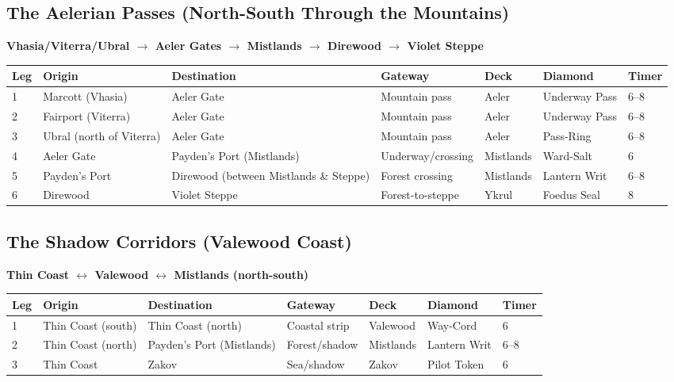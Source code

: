 \documentclass[11pt,letterpaper,twoside]{book}
\begin{document}
\subsection{The Aelerian Passes (North-South Through the Mountains)}

\textbf{Vhasia/Viterra/Ubral $\rightarrow$ Aeler Gates $\rightarrow$ Mistlands $\rightarrow$ Direwood $\rightarrow$ Violet Steppe}

\begin{longtable}{|p{1.5cm}|p{2.5cm}|p{2.5cm}|p{1.5cm}|p{2cm}|p{1.5cm}|}
\hline
\textbf{Leg} & \textbf{Origin} & \textbf{Destination} & \textbf{Gateway} & \textbf{Deck} & \textbf{Diamond} & \textbf{Timer} \\
 & Marcott (Vhasia) & Aeler Gate & Mountain pass & Aeler & Underway Pass & 6--8 \\
2 & Fairport (Viterra) & Aeler Gate & Mountain pass & Aeler & Underway Pass & 6--8 \\
3 & Ubral (north of Viterra) & Aeler Gate & Mountain pass & Aeler & Pass-Ring & 6--8 \\
4 & Aeler Gate & Payden's Port (Mistlands) & Underway/crossing & Mistlands & Ward-Salt & 6 \\
5 & Payden's Port & Direwood (between Mistlands \& Steppe) & Forest crossing & Mistlands & Lantern Writ & 6--8 \\
6 & Direwood & Violet Steppe & Forest-to-steppe & Ykrul & Foedus Seal & 8 \\
\hline
\end{longtable}

\subsection{The Shadow Corridors (Valewood Coast)}

\textbf{Thin Coast $\leftrightarrow$ Valewood $\leftrightarrow$ Mistlands (north-south)}

\begin{longtable}{|p{1.5cm}|p{2.5cm}|p{2.5cm}|p{1.5cm}|p{2cm}|p{1.5cm}|}
\hline
\textbf{Leg} & \textbf{Origin} & \textbf{Destination} & \textbf{Gateway} & \textbf{Deck} & \textbf{Diamond} & \textbf{Timer} \\
 & Thin Coast (south) & Thin Coast (north) & Coastal strip & Valewood & Way-Cord & 6 \\
2 & Thin Coast (north) & Payden's Port (Mistlands) & Forest/shadow & Mistlands & Lantern Writ & 6--8 \\
3 & Thin Coast & Zakov & Sea/shadow & Zakov & Pilot Token & 6 \\
\hline
\end{longtable}
\end{document}
